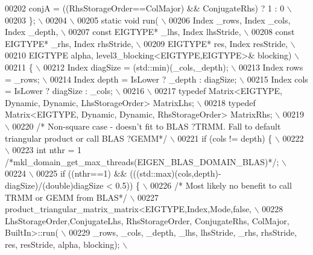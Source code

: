 \begin{DoxyCode}
00202 \textcolor{preprocessor}{    conjA = ((RhsStorageOrder==ColMajor) && ConjugateRhs) ? 1 : 0 \(\backslash\)}
00203 \textcolor{preprocessor}{  \}; \(\backslash\)}
00204 \textcolor{preprocessor}{\(\backslash\)}
00205 \textcolor{preprocessor}{  static void run( \(\backslash\)}
00206 \textcolor{preprocessor}{    Index \_rows, Index \_cols, Index \_depth, \(\backslash\)}
00207 \textcolor{preprocessor}{    const EIGTYPE* \_lhs, Index lhsStride, \(\backslash\)}
00208 \textcolor{preprocessor}{    const EIGTYPE* \_rhs, Index rhsStride, \(\backslash\)}
00209 \textcolor{preprocessor}{    EIGTYPE* res,        Index resStride, \(\backslash\)}
00210 \textcolor{preprocessor}{    EIGTYPE alpha, level3\_blocking<EIGTYPE,EIGTYPE>& blocking) \(\backslash\)}
00211 \textcolor{preprocessor}{  \{ \(\backslash\)}
00212 \textcolor{preprocessor}{   Index diagSize  = (std::min)(\_cols,\_depth); \(\backslash\)}
00213 \textcolor{preprocessor}{   Index rows      = \_rows; \(\backslash\)}
00214 \textcolor{preprocessor}{   Index depth     = IsLower ? \_depth : diagSize; \(\backslash\)}
00215 \textcolor{preprocessor}{   Index cols      = IsLower ? diagSize : \_cols; \(\backslash\)}
00216 \textcolor{preprocessor}{\(\backslash\)}
00217 \textcolor{preprocessor}{   typedef Matrix<EIGTYPE, Dynamic, Dynamic, LhsStorageOrder> MatrixLhs; \(\backslash\)}
00218 \textcolor{preprocessor}{   typedef Matrix<EIGTYPE, Dynamic, Dynamic, RhsStorageOrder> MatrixRhs; \(\backslash\)}
00219 \textcolor{preprocessor}{\(\backslash\)}
00220 \textcolor{preprocessor}{}\textcolor{comment}{/* Non-square case - doesn't fit to BLAS ?TRMM. Fall to default triangular product or call BLAS ?GEMM*/}\textcolor{preprocessor}{ \(\backslash\)}
00221 \textcolor{preprocessor}{   if (cols != depth) \{ \(\backslash\)}
00222 \textcolor{preprocessor}{\(\backslash\)}
00223 \textcolor{preprocessor}{     int nthr = 1 }\textcolor{comment}{/*mkl\_domain\_get\_max\_threads(EIGEN\_BLAS\_DOMAIN\_BLAS)*/}\textcolor{preprocessor}{; \(\backslash\)}
00224 \textcolor{preprocessor}{\(\backslash\)}
00225 \textcolor{preprocessor}{     if ((nthr==1) && (((std::max)(cols,depth)-diagSize)/(double)diagSize < 0.5)) \{ \(\backslash\)}
00226 \textcolor{preprocessor}{     }\textcolor{comment}{/* Most likely no benefit to call TRMM or GEMM from BLAS*/}\textcolor{preprocessor}{ \(\backslash\)}
00227 \textcolor{preprocessor}{       product\_triangular\_matrix\_matrix<EIGTYPE,Index,Mode,false, \(\backslash\)}
00228 \textcolor{preprocessor}{       LhsStorageOrder,ConjugateLhs, RhsStorageOrder, ConjugateRhs, ColMajor, BuiltIn>::run( \(\backslash\)}
00229 \textcolor{preprocessor}{           \_rows, \_cols, \_depth, \_lhs, lhsStride, \_rhs, rhsStride, res, resStride, alpha, blocking); \(\backslash\)}

\end{DoxyCode}
